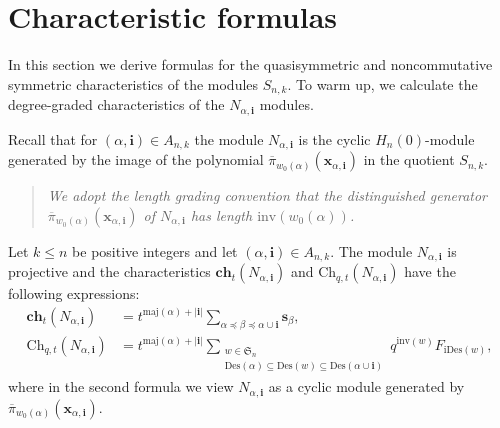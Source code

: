 \documentclass[ALCO,ThmDefs,published]{cedram}
\newcommand{\symm}{{\mathfrak{S}}}
\newcommand{\xx}{{\mathbf {x}}}
\theoremstyle{plain}
\newcommand{\maj}{{\mathrm {maj}}}
\newcommand{\inv}{{\mathrm {inv}}}
\newcommand{\Des}{{\mathrm {Des}}}
\newcommand{\Ch}{{\mathrm {Ch}}}
\newcommand{\ch}{{\mathbf {ch}}}
\newcommand{\iDes}{{\mathrm {iDes}}}
\newcommand{\symm}{{\mathfrak{S}}}
\newcommand{\xx}{{\mathbf {x}}}
\newcommand{\ii}{{\mathbf{i}}}
\newcommand{\sss}{{\mathbf{s}}}
\newcommand{\pib}{\overline{\pi}}
\newcommand{\edit}[1]{{\color{red}{\bf {#1}}}}
\begin{document}
\section{Characteristic formulas}
\label{Characteristic}


In this section we derive formulas for the quasisymmetric and noncommutative symmetric characteristics
of the modules $S_{n,k}$.  To warm up, we calculate the degree-graded characteristics of the $N_{\alpha,\ii}$ modules.

Recall that for $(\alpha, \ii) \in A_{n,k}$ the module $N_{\alpha,\ii}$ is the cyclic $H_n(0)$-module generated by the image
of the polynomial $\pib_{w_0(\alpha)}(\xx_{\alpha,\ii})$ in the quotient $S_{n,k}$.  
\begin{quote}
\emph{We adopt the length grading convention
that the distinguished generator $\pib_{w_0(\alpha)}(\xx_{\alpha,\ii})$ of $N_{\alpha,\ii}$ has length
$\inv(w_0(\alpha))$.}
\end{quote}



\begin{lemma}
\label{n-characteristic-theorem}
Let $k \leq n$ be positive integers and let $(\alpha, \ii) \in A_{n,k}$.  The module $N_{\alpha,\ii}$
is projective and  the characteristics
$\ch_t(N_{\alpha,\ii})$ and $\Ch_{q,t}(N_{\alpha,\ii})$ have the following expressions:
\begin{align}
\ch_t(N_{\alpha,\ii}) &= t^{\maj(\alpha) + |\ii|} \sum_{\alpha \preceq \beta \preceq \alpha \cup \ii}  \sss_{\beta}, \\
\Ch_{q,t}(N_{\alpha,\ii}) &=  t^{\maj(\alpha) + |\ii|} \sum_{\substack
{w \in \symm_n \\ \Des(\alpha) \subseteq \Des(w) \subseteq \Des(\alpha \cup \ii)}}
q^{\inv(w)}  F_{\iDes(w)},
\end{align}
where in the second formula we view $N_{\alpha,\ii}$ as a cyclic module generated by $\pib_{w_0(\alpha)}(\xx_{\alpha,\ii})$.
\end{lemma}
\end{document}
